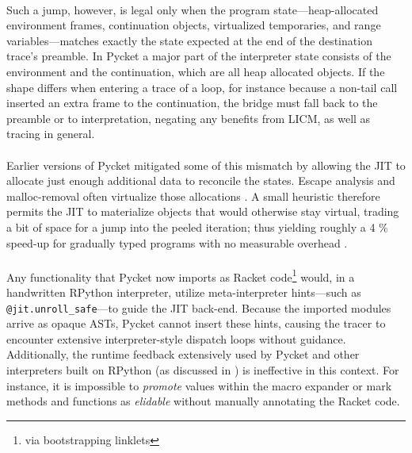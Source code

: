 	\paragraph{}%
		Such a jump, however, is legal only when the program state—heap-allocated environment frames, continuation objects, virtualized temporaries, and range variables—matches exactly the state expected at the end of the destination trace's preamble. In Pycket a major part of the interpreter state consists of the environment and the continuation, which are all heap allocated objects. If the shape differs when entering a trace of a loop, for instance because a non-tail call inserted an extra frame to the continuation, the bridge must fall back to the preamble or to interpretation, negating any benefits from LICM, as well as tracing in general.

	\paragraph{}%
		Earlier versions of Pycket mitigated some of this mismatch by allowing the JIT to allocate just enough additional data to reconcile the states. Escape analysis and malloc-removal often virtualize those allocations \cite{malloc-removal:11,loop-aware:12}. A small heuristic therefore permits the JIT to materialize objects that would otherwise stay virtual, trading a bit of space for a jump into the peeled iteration; thus yielding roughly a 4 \% speed-up for gradually typed programs with no measurable overhead \cite{pycketmain2}.

	\paragraph{}%
		Any functionality that Pycket now imports as Racket code\footnote{via bootstrapping linklets} would, in a handwritten RPython interpreter, utilize meta-interpreter hints—such as \verb|@jit.unroll_safe|—to guide the JIT back-end. Because the imported modules arrive as opaque ASTs, Pycket cannot insert these hints, causing the tracer to encounter extensive interpreter-style dispatch loops without guidance. Additionally, the runtime feedback extensively used by Pycket and other interpreters built on RPython (as discussed in ) is ineffective in this context. For instance, it is impossible to \emph{promote} values within the macro expander or mark methods and functions as \emph{elidable} without manually annotating the Racket code.

